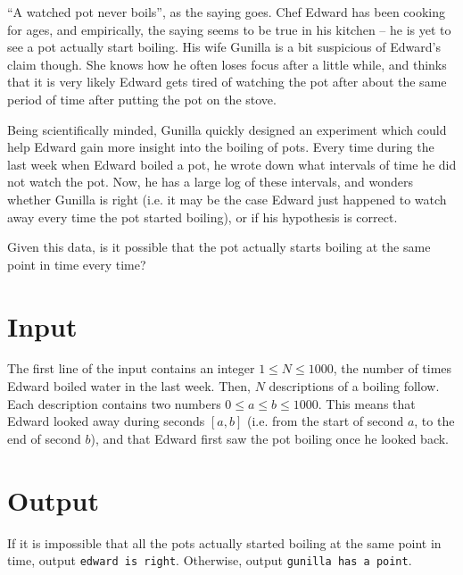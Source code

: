 ``A watched pot never boils'', as the saying goes.
Chef Edward has been cooking for ages, and empirically, the saying seems to be true in his kitchen -- he is yet to see a pot actually start boiling.
His wife Gunilla is a bit suspicious of Edward's claim though.
She knows how he often loses focus after a little while, and thinks that it is very likely Edward gets tired of watching the pot after about the same period of time after putting the pot on the stove.

Being scientifically minded, Gunilla quickly designed an experiment which could help Edward gain more insight into the boiling of pots.
Every time during the last week when Edward boiled a pot, he wrote down what intervals of time he did not watch the pot.
Now, he has a large log of these intervals, and wonders whether Gunilla is right (i.e. it may be the case Edward just happened to watch away every time the pot started boiling), or if his hypothesis is correct.

Given this data, is it possible that the pot actually starts boiling at the same point in time every time?

\section*{Input}
The first line of the input contains an integer $1 \le N \le 1000$, the number of times Edward boiled water in the last week.
Then, $N$ descriptions of a boiling follow.
Each description contains two numbers $0 \le a \le b \le 1000$.
This means that Edward looked away during seconds $[a, b]$ (i.e. from the start of second $a$, to the end of second $b$), and that Edward first saw the pot boiling once he looked back.

\section*{Output}
If it is impossible that all the pots actually started boiling at the same point in time, output \texttt{edward is right}.
Otherwise, output \texttt{gunilla has a point}.
